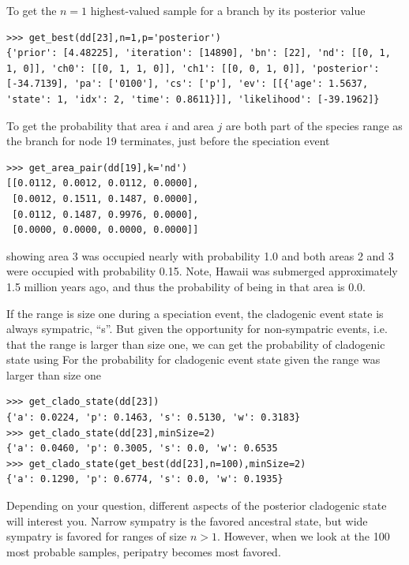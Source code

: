 \documentclass[11pt]{article}
\begin{document}
To get the $n=1$ highest-valued sample for a branch by its posterior value
\begin{snugshade}
\begin{lstlisting}
>>> get_best(dd[23],n=1,p='posterior')
{'prior': [4.48225], 'iteration': [14890], 'bn': [22], 'nd': [[0, 1, 1, 0]], 'ch0': [[0, 1, 1, 0]], 'ch1': [[0, 0, 1, 0]], 'posterior': [-34.7139], 'pa': ['0100'], 'cs': ['p'], 'ev': [[{'age': 1.5637, 'state': 1, 'idx': 2, 'time': 0.8611}]], 'likelihood': [-39.1962]}
\end{lstlisting}
\end{snugshade}

To get the probability that area $i$ and area $j$ are both part of the species range as the branch for node 19 terminates, just before the speciation event
\begin{snugshade}
\begin{lstlisting}
>>> get_area_pair(dd[19],k='nd')
[[0.0112, 0.0012, 0.0112, 0.0000],
 [0.0012, 0.1511, 0.1487, 0.0000],
 [0.0112, 0.1487, 0.9976, 0.0000],
 [0.0000, 0.0000, 0.0000, 0.0000]]
\end{lstlisting}
\end{snugshade}
showing area 3 was occupied nearly with probability 1.0 and both areas 2 and 3 were occupied with probability 0.15.
Note, Hawaii was submerged approximately 1.5 million years ago, and thus the probability of being in that area is 0.0.

If the range is size one during a speciation event, the cladogenic event state is always sympatric, ``s''.
But given the opportunity for non-sympatric events, i.e. that the range is larger than size one, we can get the probability of cladogenic state using
For the probability for cladogenic event state given the range was larger than size one
\begin{snugshade}
\begin{lstlisting}
>>> get_clado_state(dd[23])
{'a': 0.0224, 'p': 0.1463, 's': 0.5130, 'w': 0.3183}
>>> get_clado_state(dd[23],minSize=2)
{'a': 0.0460, 'p': 0.3005, 's': 0.0, 'w': 0.6535
>>> get_clado_state(get_best(dd[23],n=100),minSize=2)
{'a': 0.1290, 'p': 0.6774, 's': 0.0, 'w': 0.1935}
\end{lstlisting}
\end{snugshade}

Depending on your question, different aspects of the posterior cladogenic state will interest you.
Narrow sympatry is the favored ancestral state, but wide sympatry is favored for ranges of size $n>1$.
However, when we look at the 100 most probable samples, peripatry becomes most favored.
\end{document}
